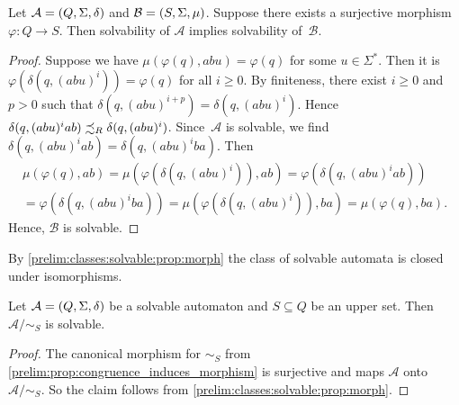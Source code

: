 \begin{proposition} \label{prelim:classes:solvable:prop:morph}
	Let $\mathcal A = (Q, \Sigma, \delta)$
	and $\mathcal B = (S, \Sigma, \mu)$.
	Suppose there exists a surjective morphism $\varphi \colon Q \to S$.
	Then solvability of $\mathcal A$ implies solvability of~$\mathcal B$.
\end{proposition}
\begin{proof}
	Suppose we have $\mu(\varphi(q), abu) = \varphi(q)$ for some $u \in \Sigma^*$.
	Then it is $\varphi(\delta(q, (abu)^i)) = \varphi(q)$
	for all $i \ge 0$. By finiteness, there exist $i \ge 0$
	and $p > 0$
	such that $\delta(q, (abu)^{i + p}) = \delta(q, (abu)^i)$.
	Hence $\delta(q, (abu)^{i}ab) \precsim_R \delta(q, (abu)^i)$.
	Since~$\mathcal A$ is solvable,
	we find $\delta(q, (abu)^iab) = \delta(q, (abu)^iba)$.
	Then 
	\begin{multline*}
		\mu(\varphi(q), ab)  = \mu(\varphi(\delta(q, (abu)^i)), ab) 
		= \varphi(\delta(q, (abu)^i ab)) \\
		= \varphi(\delta(q, (abu)^i ba)) 
		= \mu(\varphi(\delta(q, (abu)^i)),ba) 
		= \mu(\varphi(q), ba).
	\end{multline*}	
	Hence, $\mathcal B$ is solvable.
\end{proof}

By \cref{prelim:classes:solvable:prop:morph} the class of solvable automata %
is closed under isomorphisms.

\begin{corollary}\label{prelim:classes:solvable:cor:subhom}
	Let $\mathcal A = (Q, \Sigma, \delta)$ be a solvable automaton
	and $S \subseteq Q$ be an upper set.
	Then $\mathcal A / {\sim_S}$ is solvable.
\end{corollary} 
\begin{proof}
	The canonical morphism for $\sim_S$
	from \cref{prelim:prop:congruence_induces_morphism} is surjective and
	maps $\mathcal A$ onto $\mathcal A / {\sim_S}$.
	So the claim follows from \cref{prelim:classes:solvable:prop:morph}.
\end{proof}

